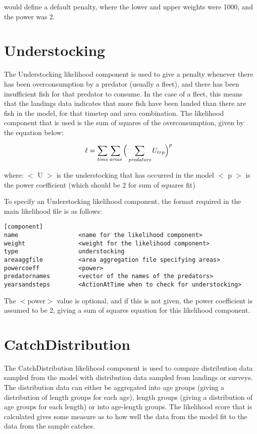 \documentclass[10pt,twoside]{book}
\begin{document}
would define a default penalty, where the lower and upper weights were 1000, and the power was 2.

\section{Understocking}\label{sec:understocking}
The Understocking likelihood component is used to give a penalty whenever there has been overconsumption by a predator (usually a fleet), and there has been insufficient fish for that predator to consume.  In the case of a fleet, this means that the landings data indicates that more fish have been landed than there are fish in the model, for that timetep and area combination.  The likelihood component that is used is the sum of squares of the overconsumption, given by the equation below:

\begin{equation}\label{eq:understocking}
\ell = \sum_{\it time}\sum_{\it areas} \Big(\sum_{\it predators} U_{trp} \Big)^p
\end{equation}

where:\newline
$<$ U $>$ is the understocking that has occurred in the model\newline
$<$ p $>$ is the power coefficient (which should be 2 for sum of squares fit)

\bigskip
To specify an Understocking likelihood component, the format required in the main likelihood file is as follows:

{\small\begin{verbatim}
[component]
name                 <name for the likelihood component>
weight               <weight for the likelihood component>
type                 understocking
areaaggfile          <area aggregation file specifying areas>
powercoeff           <power>
predatornames        <vector of the names of the predators>
yearsandsteps        <ActionAtTime when to check for understocking>
\end{verbatim}}

The $<$power$>$ value is optional, and if this is not given, the power coefficient is assumed to be 2, giving a sum of squares equation for this likelihood component.

\section{CatchDistribution}\label{sec:catchdist}
The CatchDistribution likelihood component is used to compare distribution data sampled from the model with distribution data sampled from landings or surveys.  The distribution data can either be aggregated into age groups (giving a distribution of length groups for each age), length groups (giving a distribution of age groups for each length) or into age-length groups.  The likelihood score that is calculated gives some measure as to how well the data from the model fit to the data from the sample catches.
\end{document}

